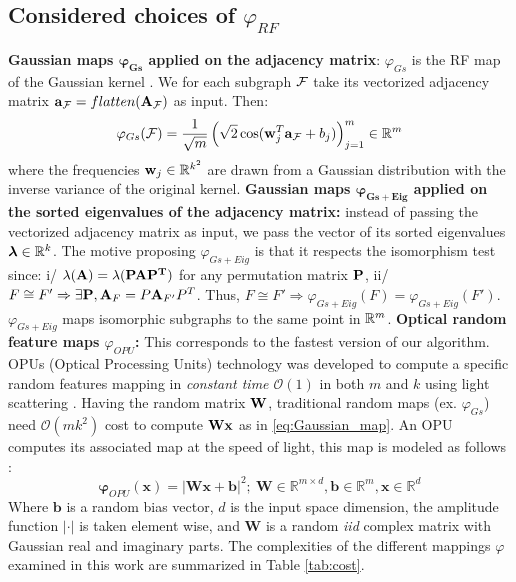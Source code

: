 \documentclass{article}
\begin{document}
\subsection{Considered choices of $\varphi_{RF}$}
\label{sec:phi_choices}
\textbf{Gaussian maps $\boldsymbol{\varphi_{Gs}}$ applied on the adjacency matrix}: $\varphi_{Gs}$ is the RF map of the Gaussian kernel \cite{rahimi2008random}. We for each subgraph $\mathcal{F}$ take its vectorized adjacency matrix  $\mathbf{a}_{\mathcal{F}}=flatten(\mathbf{A}_{\mathcal{F}})$ as input. Then:
\begin{equation}
\label{eq:Gaussian_map}
    \varphi_{Gs}(\mathcal{F}) = \frac{1}{\sqrt{m}} \left( \sqrt{2} \cos(\mathbf{w}_j^T\mathbf{a}_{\mathcal{F}}+b_j) \right)_{j=1}^m \in \mathbb{R}^m
\end{equation}
where the frequencies $\mathbf{w}_j\in \mathbb{R}^{k^2}$ are drawn from a Gaussian distribution with the inverse variance of the original kernel. 
\BlankLine
\noindent\textbf{Gaussian maps $\boldsymbol{\varphi_{Gs+Eig}}$ applied on the sorted eigenvalues of the adjacency matrix:} instead of passing the vectorized adjacency matrix as input, we pass the vector of its sorted eigenvalues $\bm{\lambda}\in\mathbb{R}^k$. The motive proposing $\varphi_{Gs+Eig}$ is that it respects the isomorphism test since: 
i/ $\mathbf{\lambda}(\mathbf{A})=\mathbf{\lambda}(\mathbf{PAP^T})$ for any permutation matrix $\mathbf{P}$, 
ii/ $F\cong F' \Rightarrow\exists \mathbf{P}, \mathbf{A}_F=P\mathbf{A}_{F'}P^T$.  
Thus, $F\cong F' \Rightarrow \varphi_{Gs+Eig}(F)=\varphi_{Gs+Eig}(F')$. $\varphi_{Gs+Eig}$ maps isomorphic subgraphs to the same point in $\mathbb{R}^m$.
\BlankLine
\noindent\textbf{Optical random feature maps $\varphi_{OPU}$:} This corresponds to the fastest version of our algorithm. OPUs (Optical Processing Units) technology was developed to compute  a specific random features mapping in \emph{constant time  $\mathcal{O}(1)$} in both $m$ and $k$ using light scattering \cite{saade_opu}. Having the random matrix $\mathbf{W}$, traditional random maps (ex. $\varphi_{Gs}$) need  $\mathcal{O}(mk^2)$ cost to compute $\mathbf{Wx}$ as in \eqref{eq:Gaussian_map}. An OPU computes its associated map at the speed of light, this map is modeled as follows \cite{saade_opu}:
\[
\label{OPU_equation}
\mathbf{\varphi}_{OPU}(\mathbf{x})=|\mathbf{Wx+b}|^2 ;~\mathbf{W}\in \mathbb{R}^{m\times d},\mathbf{b}\in \mathbb{R}^m, \mathbf{x}\in \mathbb{R}^d
\]
Where $\mathbf{b}$ is a random bias vector, $d$ is the input space dimension, the amplitude function $|\cdot|$ is taken element wise, and $\mathbf{W}$ is a random \emph{iid} complex matrix with Gaussian real and imaginary parts.
The complexities of the different mappings $\varphi$ examined in this work are summarized in Table \ref{tab:cost}.
\end{document}
